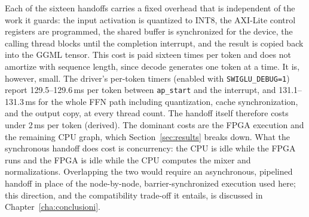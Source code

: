 Each of the sixteen handoffs carries a fixed overhead that is independent of the work it
guards: the input activation is quantized to INT8, the AXI-Lite control registers are
programmed, the shared buffer is synchronized for the device, the calling thread blocks
until the completion interrupt, and the result is copied back into the GGML tensor. This
cost is paid sixteen times per token and does not amortize with sequence length, since
decode generates one token at a time. It is, however, small. The driver's per-token
timers (enabled with \texttt{SWIGLU\_DEBUG=1}) report 129.5--129.6\,ms per token
between \texttt{ap\_start} and the interrupt, and 131.1--131.3\,ms for the whole FFN
path including quantization, cache synchronization, and the output copy, at every
thread count. The handoff itself therefore costs under 2\,ms per token (derived). The
dominant costs are the FPGA execution and the remaining CPU graph, which
Section~\ref{sec:results} breaks down. What the synchronous handoff does cost is
concurrency: the CPU is idle while the FPGA runs and the FPGA is idle while the CPU
computes the mixer and normalizations. Overlapping the two would require an
asynchronous, pipelined handoff in place of the node-by-node, barrier-synchronized
execution used here; this direction, and the compatibility trade-off it entails, is
discussed in Chapter~\ref{cha:conclusioni}.

